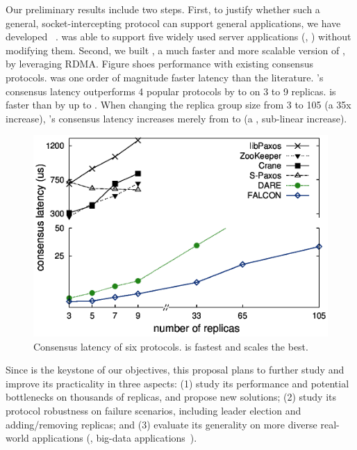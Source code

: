  Our preliminary results include two steps. First, 
to justify whether such a general, socket-intercepting protocol can support 
general applications, we have developed \crane~\cite{crane:sosp15}. \crane was 
able to support five widely used server applications (\eg, \mysql) without 
modifying them. Second, we built \falcon, a much faster and more scalable 
version of \crane, by leveraging RDMA. Figure shoes \falcon performance with 
existing consensus protocols. \falcon was one order of magnitude faster latency 
than the literature. \falcon's consensus latency outperforms 4 popular \paxos 
protocols by \comptradlow to \comptradhigh on 3 to 9 replicas. \falcon is 
faster than \dare by up to \fasterDARE. When changing the replica group size 
from 3 to 105 (a 35x increase), \falcon's consensus latency increases merely 
from \xxxlatencythree \us to \xxxlatencyonezerofive \us (a \xxxscalability, 
sub-linear increase).

\begin{figure}[!htb]
\centering
\includegraphics[width=0.34\textheight]{figures/traditional_paxos_latency.ps}
        \vspace{-.2in}
        \caption{Consensus latency of six \paxos protocols. \falcon is fastest 
and scales the best.}
        \label{fig:scalability}
\end{figure}

 Since \falcon is the keystone of our objectives, this 
proposal plans to further study and improve its practicality in three aspects: 
(1) study its performance and potential bottlenecks on thousands of replicas, 
and propose new solutions; (2) study its protocol robustness on failure 
scenarios, including leader election and adding/removing replicas; and (3) 
evaluate its generality on more diverse real-world applications (\eg, big-data 
applications~\cite{spark:nsdi12}). 

